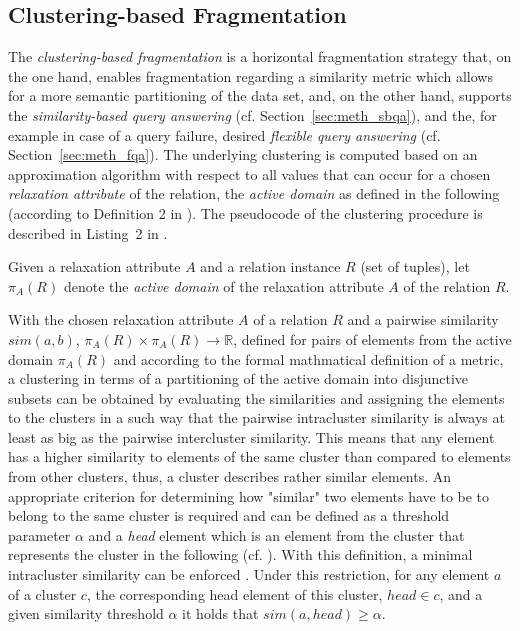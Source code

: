  
 
\subsection{Clustering-based Fragmentation}
\label{sec:meth_cbfr}

The \emph{clustering-based fragmentation} \citep{Wiese2014} is a horizontal fragmentation strategy that, on the one hand, enables fragmentation regarding 
a similarity metric which allows for a more semantic partitioning of the data set, and, on the other hand, supports the \emph{similarity-based query
answering} (cf. Section~\ref{sec:meth_sbqa}), and the, for example in case of a query failure, desired \emph{flexible query answering} 
(cf. Section~\ref{sec:meth_fqa}). The underlying clustering is computed based on an approximation algorithm \citep{Gonzales1985} with respect to all 
values that can occur for a chosen \emph{relaxation attribute} of the relation, the \emph{active domain} as defined in the following (according to
Definition 2 in \cite{Wiese2014}). The pseudocode of the clustering procedure is described in Listing~2 in \cite{Wiese2014}.

\begin{definition}
Given a relaxation attribute $A$ and a relation instance $R$ (set of tuples), let $\pi_A(R)$ denote the \emph{active domain} of the relaxation attribute
$A$ of the relation $R$.
\end{definition}

With the chosen relaxation attribute $A$ of a relation $R$ and a pairwise similarity $sim(a, b)$, $\pi_A(R) \times \pi_A(R) \to \mathbb{R}$, defined  
for pairs of elements from the active domain $\pi_A(R)$ and according to the formal mathmatical definition of a metric, a clustering in terms of a 
partitioning of the active domain into disjunctive subsets can be obtained by evaluating the similarities and assigning the elements to the clusters in
a such way that the pairwise intracluster similarity \citep{Gonzales1985} is always at least as big as the pairwise intercluster similarity. This means that
any element has a higher similarity to elements of the same cluster than compared to elements from other clusters, thus, a cluster describes rather similar
elements. An appropriate criterion for determining how "similar" two elements have to be to belong to the same cluster is required and can be defined as a
threshold parameter $\alpha$ and a \emph{head} element which is an element from the cluster that represents the cluster in the following (cf. \citet{Wiese2014}).
With this definition, a minimal intracluster similarity can be enforced \citep{Gonzales1985}. Under this restriction, for any element $a$ of a cluster $c$, the
corresponding head element of this cluster, $head \in c$, and a given similarity threshold $\alpha$ it holds that $sim(a,head) \geq \alpha$. 


